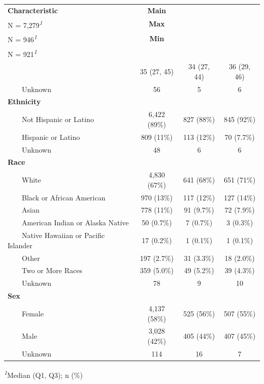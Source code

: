 \begin{table}[t]
\fontsize{12.0pt}{14.4pt}\selectfont
\begin{tabular*}{\linewidth}{@{\extracolsep{\fill}}lccc}
\toprule
\textbf{Characteristic} & \textbf{Main}\\
N = 7,279\textsuperscript{\textit{1}} & \textbf{Max}\\
N = 946\textsuperscript{\textit{1}} & \textbf{Min}\\
N = 921\textsuperscript{\textit{1}} \\ 
\midrule\addlinespace[2.5pt]
{\bfseries Age} & 35 (27, 45) & 34 (27, 44) & 36 (29, 46) \\ 
    Unknown & 56 & 5 & 6 \\ 
{\bfseries Ethnicity} &  &  &  \\ 
    Not Hispanic or Latino & 6,422 (89\%) & 827 (88\%) & 845 (92\%) \\ 
    Hispanic or Latino & 809 (11\%) & 113 (12\%) & 70 (7.7\%) \\ 
    Unknown & 48 & 6 & 6 \\ 
{\bfseries Race} &  &  &  \\ 
    White & 4,830 (67\%) & 641 (68\%) & 651 (71\%) \\ 
    Black or African American & 970 (13\%) & 117 (12\%) & 127 (14\%) \\ 
    Asian & 778 (11\%) & 91 (9.7\%) & 72 (7.9\%) \\ 
    American Indian or Alaska Native & 50 (0.7\%) & 7 (0.7\%) & 3 (0.3\%) \\ 
    Native Hawaiian or Pacific Islander & 17 (0.2\%) & 1 (0.1\%) & 1 (0.1\%) \\ 
    Other & 197 (2.7\%) & 31 (3.3\%) & 18 (2.0\%) \\ 
    Two or More Races & 359 (5.0\%) & 49 (5.2\%) & 39 (4.3\%) \\ 
    Unknown & 78 & 9 & 10 \\ 
{\bfseries Sex} &  &  &  \\ 
    Female & 4,137 (58\%) & 525 (56\%) & 507 (55\%) \\ 
    Male & 3,028 (42\%) & 405 (44\%) & 407 (45\%) \\ 
    Unknown & 114 & 16 & 7 \\ 
\bottomrule
\end{tabular*}
\begin{minipage}{\linewidth}
\textsuperscript{\textit{1}}Median (Q1, Q3); n (\%)\\
\end{minipage}
\end{table}

